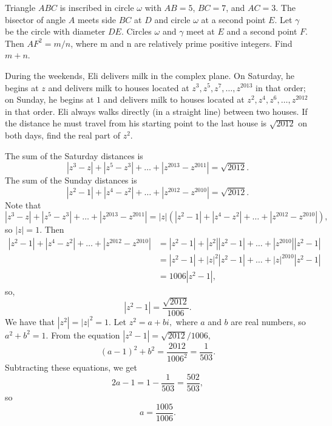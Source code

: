 %	












\begin{question}[name={2012 AIME II, \href{https://artofproblemsolving.com/community/c4p2644107}{Problem 15}}]
	Triangle $ABC$ is inscribed in circle $\omega$ with $AB = 5$, $BC = 7$, and $AC = 3$. The bisector of angle $A$ meets side $BC$ at $D$ and circle $\omega$ at a second point $E$. Let $\gamma$ be the circle with diameter $DE$. Circles $\omega$ and $\gamma$ meet at $E$ and a second point $F$. Then $AF^2 =  m/n$, where m and n are relatively prime positive integers. Find $m + n$.
\end{question}


%	



\begin{question}[name={2012 HMMT, Algebra, \href{https://artofproblemsolving.com/community/c129h521062p2934962}{Problem 4}}]
	During the weekends, Eli delivers milk in the complex plane. On Saturday, he begins at $z$ and delivers milk to houses located at $z^3,z^5,z^7,\ldots,z^{2013}$ in that order; on Sunday, he begins at $1$ and delivers milk to houses located at $z^2,z^4,z^6,\ldots,z^{2012}$ in that order. Eli always walks directly (in a straight line) between two houses. If the distance he must travel from his starting point to the last house is $\sqrt{2012}$ on both days, find the real part of $z^2$.
\end{question}



\begin{solution}[name={Solution by jaymuro}]
	The sum of the Saturday distances is
	\[|z^3 - z| + |z^5 - z^3| + \dots + |z^{2013} - z^{2011}| = \sqrt{2012}.\]The sum of the Sunday distances is
	\[|z^2 - 1| + |z^4 - z^2| + \dots + |z^{2012} - z^{2010}| = \sqrt{2012}.\]Note that
	\[|z^3 - z| + |z^5 - z^3| + \dots + |z^{2013} - z^{2011}| = |z| (|z^2 - 1| + |z^4 - z^2| + \dots + |z^{2012} - z^{2010}|),\]so $|z| = 1.$ Then
	\begin{align*}
		|z^2 - 1| + |z^4 - z^2| + \dots + |z^{2012} - z^{2010}| &= |z^2 - 1| + |z^2| |z^2 - 1| + \dots + |z^{2010}| |z^2 - 1| \\
		&= |z^2 - 1| + |z|^2 |z^2 - 1| + \dots + |z|^{2010} |z^2 - 1| \\
		&= 1006 |z^2 - 1|,
	\end{align*}so,
	\[|z^2 - 1| = \frac{\sqrt{2012}}{1006}.\]We have that $|z^2| = |z|^2 = 1.$ Let $z^2 = a + bi,$ where $a$ and $b$ are real numbers, so $a^2 + b^2 = 1.$ From the equation $|z^2 - 1| = {\sqrt{2012}}/{1006},$
	\[(a - 1)^2 + b^2 = \frac{2012}{1006^2} = \frac{1}{503}.\]Subtracting these equations, we get
	\[2a - 1 = 1 - \frac{1}{503} = \frac{502}{503},\]so $$a = \boxed{\frac{1005}{1006}}.$$
\end{solution}


